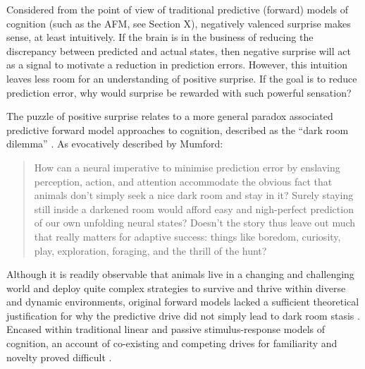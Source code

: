 \begin{CJK}{UTF8}{gbsn}
Considered from the point of view of traditional predictive (forward) models of cognition (such as the AFM, see Section X), negatively valenced surprise makes sense, at least intuitively.  If the brain is
in the business of reducing the discrepancy between predicted and actual states, then negative surprise will act as a signal to motivate a reduction in prediction errors.  However, this intuition leaves less room for an understanding of positive surprise.  If the goal is to reduce prediction error, why would surprise be rewarded with such powerful sensation?

The puzzle of positive surprise relates to a more general paradox associated predictive forward model approaches to cognition, described as the ``dark room dilemma'' \citep{Mumford1992}.  As evocatively described by Mumford:

      \begin{quote}
        How can a neural imperative to minimise prediction error by enslaving perception, action, and attention accommodate the obvious fact that animals don’t simply seek a nice dark room and stay in it? Surely staying still inside a darkened room would afford easy and nigh-perfect prediction of our own unfolding neural states? Doesn’t the story thus leave out much that really matters for adaptive success: things like boredom, curiosity, play, exploration, foraging, and the thrill of the hunt? \citep[243]{Mumford1992}
      \end{quote}

Although it is readily observable that animals live in a changing and challenging world and deploy quite complex strategies to survive and thrive within diverse and dynamic environments, original forward models lacked a sufficient theoretical justification for why the predictive drive did not simply lead to dark room stasis \citep{Clark2013}.  Encased within traditional linear and passive stimulus-response models of cognition, an account of co-existing and competing drives for familiarity and novelty proved difficult \citep{Kelso2009}.


\end{CJK}
